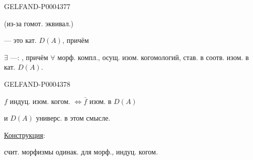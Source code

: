 \begin{GelfandAdjacentEvidence}{GELFAND-P000437}{7}


(из-за гомот. эквивал.)

 — это кат. $D(A)$, причём

$\exists$ —: , причём $\forall$ морф. компл., осущ. изом. когомологий, став. в соотв. изом. в кат. $D(A)$.
\end{GelfandAdjacentEvidence}
\begin{GelfandAdjacentEvidence}{GELFAND-P000437}{8}


$f$ индуц. изом. когом. $\boldsymbol{\Longleftrightarrow}\bar f$ изом. в $D(A)$
\end{GelfandAdjacentEvidence}


и $D(A)$ универс. в этом смысле.

\underline{Конструкция}:

счит. морфизмы одинак. для морф., индуц. когом.


